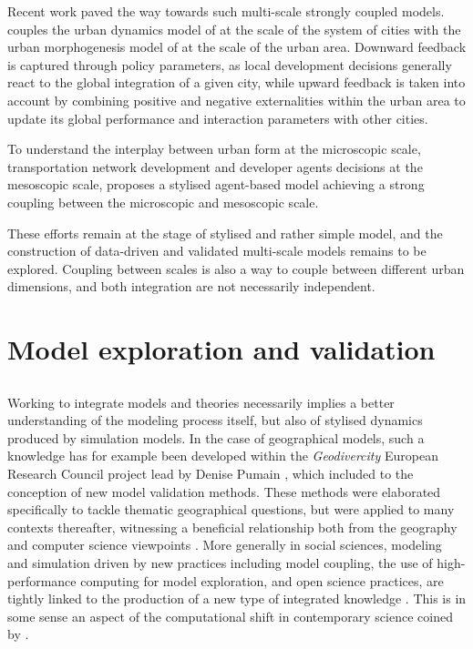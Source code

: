 Recent work paved the way towards such multi-scale strongly coupled models. \cite{raimbault2021strong} couples the urban dynamics model of \cite{raimbault2020indirect} at the scale of the system of cities with the urban morphogenesis model of \cite{raimbault2018calibration} at the scale of the urban area. Downward feedback is captured through policy parameters, as local development decisions generally react to the global integration of a given city, while upward feedback is taken into account by combining positive and negative externalities within the urban area to update its global performance and interaction parameters with other cities.

To understand the interplay between urban form at the microscopic scale, transportation network development and developer agents decisions at the mesoscopic scale, \cite{raimbault2021multiscale} proposes a stylised agent-based model achieving a strong coupling between the microscopic and mesoscopic scale.

These efforts remain at the stage of stylised and rather simple model, and the construction of data-driven and validated multi-scale models remains to be explored. Coupling between scales is also a way to couple between different urban dimensions, and both integration are not necessarily independent.


\section{Model exploration and validation}



\subsection{}

Working to integrate models and theories necessarily implies a better understanding of the modeling process itself, but also of stylised dynamics produced by simulation models. In the case of geographical models, such a knowledge has for example been developed within the \emph{Geodivercity} European Research Council project lead by Denise Pumain \cite{pumain2017urban}, which included to the conception of new model validation methods. These methods were elaborated specifically to tackle thematic geographical questions, but were applied to many contexts thereafter, witnessing a beneficial relationship both from the geography and computer science viewpoints \cite{raimbault2019methods}. More generally in social sciences, modeling and simulation driven by new practices including model coupling, the use of high-performance computing for model exploration, and open science practices, are tightly linked to the production of a new type of integrated knowledge \cite{banos2013pour}. This is in some sense an aspect of the computational shift in contemporary science coined by \cite{arthur2014complexity}.


